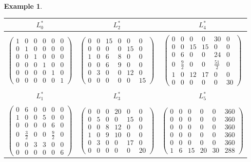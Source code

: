 \documentclass[11pt]{amsart}
\newcommand{\pmat}[1]{\begin{pmatrix} #1 \end{pmatrix}}
\theoremstyle{plain} %
\theoremstyle{definition} %
\newtheorem{ex}[thm]{Example} %
\theoremstyle{remark} %
\begin{document}
\begin{ex}
\begin{table}[H]
  \setlength{\arraycolsep}{1.7pt}
\renewcommand{\arraystretch}{1.0}
  \begin{center}
      \begin{tabular}{ccc}
      \\
           $L^*_0$&$L^*_2$&$L^*_4$\\ 
\hline%
\\
$\pmat{1&0&0&0&0&0\\0&1&0&0&0&0\\0&0&1&0&0&0\\0&0&0&1&0&0\\0&0&0&0&1&0\\0&0&0&0&0&1}$&$\pmat{0 & 0 & 15 & 0 & 0 & 0 \\
0 & 0 & 0 & 0 & 15 & 0 \\
1 & 0 & 6 & 8 & 0 & 0 \\
0 & 0 & 6 & 9 & 0 & 0 \\
0 & 3 & 0 & 0 & 12 & 0 \\
0 & 0 & 0 & 0 & 0 & 15}$&$\pmat{0 & 0 & 0 & 0 & 30 & 0 \\
0 & 0 & 15 & 15 & 0 & 0 \\
0 & 6 & 0 & 0 & 24 & 0 \\
0 & \tfrac{9}{2} & 0 & 0 & \tfrac{51}{2} & 0 \\
1 & 0 & 12 & 17 & 0 & 0 \\
0 & 0 & 0 & 0 & 0 & 30}$\\
\\
$L^*_1$&$L^*_3$&$L^*_5$\\
\hline%
\\
$\pmat{0 & 6 & 0 & 0 & 0 & 0 \\
1 & 0 & 0 & 5 & 0 & 0 \\
0 & 0 & 0 & 0 & 6 & 0 \\
0 & \tfrac{3}{2} & 0 & 0 & \tfrac{9}{2} & 0 \\
0 & 0 & 3 & 3 & 0 & 0 \\
0 & 0 & 0 & 0 & 0 & 6}$
&$\pmat{0 & 0 & 0 & 20 & 0 & 0 \\
0 & 5 & 0 & 0 & 15 & 0 \\
0 & 0 & 8 & 12 & 0 & 0 \\
1 & 0 & 9 & 10 & 0 & 0 \\
0 & 3 & 0 & 0 & 17 & 0 \\
0 & 0 & 0 & 0 & 0 & 20}$
&$\pmat{0 & 0 & 0 & 0 & 0 & 360 \\
0 & 0 & 0 & 0 & 0 & 360 \\
0 & 0 & 0 & 0 & 0 & 360 \\
0 & 0 & 0 & 0 & 0 & 360 \\
0 & 0 & 0 & 0 & 0 & 360 \\
1 & 6 & 15 & 20 & 30 & 288}$
      \end{tabular}
  \end{center}
\end{table}
\end{ex}
\end{document}
